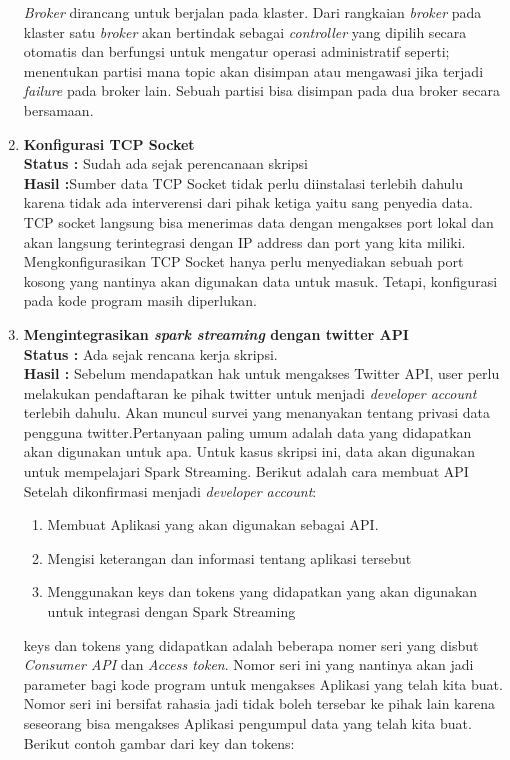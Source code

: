 \documentclass[a4paper,twoside]{article}
\begin{document}
\begin{enumerate}
 		\textit{Broker} dirancang untuk berjalan pada klaster. Dari rangkaian \textit{broker} pada 				klaster
 		satu \textit{broker} akan bertindak sebagai \textit{controller} yang dipilih secara otomatis 		dan berfungsi untuk mengatur operasi administratif seperti; menentukan partisi mana topic 				akan disimpan atau mengawasi jika terjadi \textit{failure} pada broker lain. Sebuah partisi 			bisa disimpan pada dua broker secara bersamaan.
 		
 		\item \textbf{Konfigurasi TCP Socket}\\
		{\bf Status :} Sudah ada sejak perencanaan skripsi\\
		{\bf Hasil :}Sumber data TCP Socket tidak perlu diinstalasi terlebih dahulu karena tidak ada 		interverensi dari pihak ketiga yaitu sang penyedia data. TCP socket langsung bisa menerimas 			data dengan mengakses port lokal dan akan langsung terintegrasi dengan IP address dan port 				yang kita miliki. Mengkonfigurasikan TCP Socket hanya perlu menyediakan sebuah port kosong 				yang nantinya akan digunakan data untuk masuk. Tetapi, konfigurasi pada kode program masih 				diperlukan.
		
		\item \textbf{Mengintegrasikan \textit{spark streaming} dengan twitter API}\\
		{\bf Status :} Ada sejak rencana kerja skripsi.\\
		{\bf Hasil :} Sebelum mendapatkan hak untuk mengakses Twitter API, user perlu melakukan 				pendaftaran ke pihak twitter untuk menjadi \textit{developer account} terlebih dahulu. Akan 			muncul survei yang menanyakan tentang privasi data pengguna twitter.Pertanyaan paling umum 				adalah data yang didapatkan akan digunakan untuk apa. Untuk kasus skripsi ini, data akan 				digunakan untuk mempelajari Spark Streaming. Berikut adalah cara membuat API Setelah 					dikonfirmasi menjadi \textit{developer account}:

	\begin{enumerate}
		\item Membuat Aplikasi yang akan digunakan sebagai API.
		\item Mengisi keterangan dan informasi tentang aplikasi tersebut
		\item Menggunakan keys dan tokens yang didapatkan yang akan digunakan untuk integrasi dengan 		Spark Streaming
	\end{enumerate} 

	keys dan tokens yang didapatkan adalah beberapa nomer seri yang disbut \textit{Consumer API} dan 	\textit{Access token}. 
	Nomor seri ini yang nantinya akan jadi parameter bagi kode program untuk mengakses Aplikasi yang 	telah kita buat. 
	Nomor seri ini bersifat rahasia jadi tidak boleh tersebar ke pihak lain karena seseorang bisa 			mengakses Aplikasi pengumpul data yang telah kita buat. 
	Berikut contoh gambar dari key dan tokens:


\end{enumerate}
\end{document}
